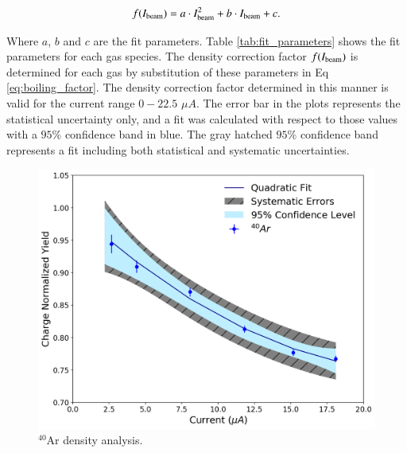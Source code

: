 \documentclass[final,5p,times,twocolumn]{elsarticle}
\begin{document}
\begin{equation}
f(I_{\rm{beam}}) = a\cdot I_{\rm{beam}}^{2} + b \cdot I_{\rm{beam}} + c.
\label{eq:boiling_factor}
\end{equation}

\noindent Where $a$, $b$ and $c$ are the fit parameters. Table \ref{tab:fit_parameters} shows the fit parameters for each gas species. The density correction factor $f(I_{\rm{beam}})$ is determined for each gas by substitution of these parameters in Eq \ref{eq:boiling_factor}. The density correction factor determined in this manner is valid for the current range $0-22.5$ $\mu A$. The error bar in the plots represents the statistical uncertainty only, and a fit was calculated with respect to those values with a $95\%$ confidence band in blue. The gray hatched $95\%$ confidence band represents a fit including both statistical and systematic uncertainties.

\begin{figure}[!h]
	\centering
	\includegraphics[width=\linewidth]{images/argon_data.pdf}
	\caption{$^{40}$Ar density analysis.}
	\label{fig:argon_data}
\end{figure}
\end{document}
